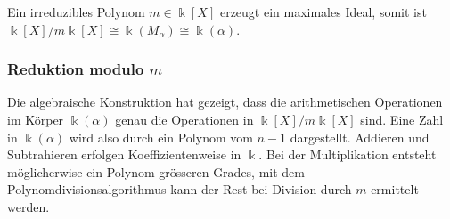 Ein irreduzibles Polynom $m\in\Bbbk[X]$ erzeugt ein maximales Ideal,
somit ist $\Bbbk[X]/m\Bbbk[X]\cong \Bbbk(M_\alpha) \cong \Bbbk(\alpha)$.

\subsubsection{Reduktion modulo $m$}
Die algebraische Konstruktion hat gezeigt, dass die arithmetischen
Operationen im Körper $\Bbbk(\alpha)$ genau die Operationen 
in $\Bbbk[X]/m\Bbbk[X]$ sind.
Eine Zahl in $\Bbbk(\alpha)$ wird also durch ein Polynom vom 
$n-1$ dargestellt.
Addieren und Subtrahieren erfolgen Koeffizientenweise in $\Bbbk$.
Bei der Multiplikation entsteht möglicherwise ein Polynom grösseren
Grades, mit dem Polynomdivisionsalgorithmus kann der Rest bei Division
durch $m$ ermittelt werden.

